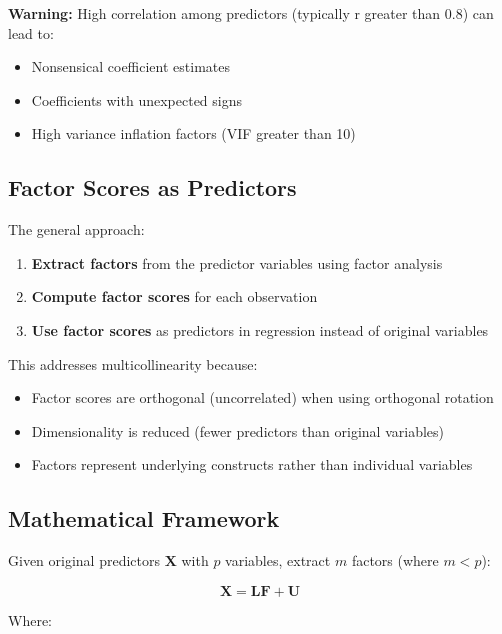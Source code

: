 \documentclass[
]{article}
\begin{document}
\textbf{Warning: } High correlation among predictors (typically
\textbar r\textbar{} greater than 0.8) can lead to:

\begin{itemize}
\item
  Nonsensical coefficient estimates
\item
  Coefficients with unexpected signs
\item
  High variance inflation factors (VIF greater than 10)
\end{itemize}

\textbf{ }

\subsection{Factor Scores as Predictors}

The general approach:

\begin{enumerate}
\item
  \textbf{Extract factors} from the predictor variables using factor
  analysis
\item
  \textbf{Compute factor scores} for each observation
\item
  \textbf{Use factor scores} as predictors in regression instead of
  original variables
\end{enumerate}

This addresses multicollinearity because:

\begin{itemize}
\item
  Factor scores are orthogonal (uncorrelated) when using orthogonal
  rotation
\item
  Dimensionality is reduced (fewer predictors than original variables)
\item
  Factors represent underlying constructs rather than individual
  variables
\end{itemize}

\textbf{ }

\subsection{Mathematical Framework}

Given original predictors \(\mathbf{X}\) with \(p\) variables, extract
\(m\) factors (where \(m < p\)):

\[\mathbf{X} = \mathbf{L}\mathbf{F} + \mathbf{U}\]

Where:
\end{document}
